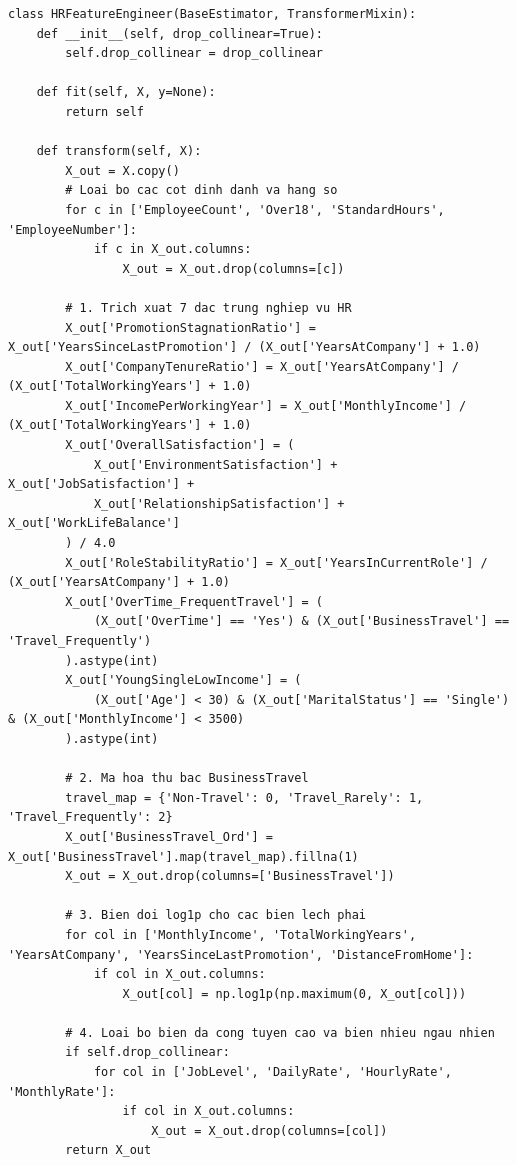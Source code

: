 \documentclass[12pt,a4paper]{article}
\begin{document}
\begin{lstlisting}[caption={Hiện thực hóa bộ biến đổi đặc trưng nghiệp vụ HR (\texttt{src/preprocessing.py}).}, label={lst:fe_class}]
class HRFeatureEngineer(BaseEstimator, TransformerMixin):
    def __init__(self, drop_collinear=True):
        self.drop_collinear = drop_collinear

    def fit(self, X, y=None):
        return self

    def transform(self, X):
        X_out = X.copy()
        # Loai bo cac cot dinh danh va hang so
        for c in ['EmployeeCount', 'Over18', 'StandardHours', 'EmployeeNumber']:
            if c in X_out.columns:
                X_out = X_out.drop(columns=[c])

        # 1. Trich xuat 7 dac trung nghiep vu HR
        X_out['PromotionStagnationRatio'] = X_out['YearsSinceLastPromotion'] / (X_out['YearsAtCompany'] + 1.0)
        X_out['CompanyTenureRatio'] = X_out['YearsAtCompany'] / (X_out['TotalWorkingYears'] + 1.0)
        X_out['IncomePerWorkingYear'] = X_out['MonthlyIncome'] / (X_out['TotalWorkingYears'] + 1.0)
        X_out['OverallSatisfaction'] = (
            X_out['EnvironmentSatisfaction'] + X_out['JobSatisfaction'] +
            X_out['RelationshipSatisfaction'] + X_out['WorkLifeBalance']
        ) / 4.0
        X_out['RoleStabilityRatio'] = X_out['YearsInCurrentRole'] / (X_out['YearsAtCompany'] + 1.0)
        X_out['OverTime_FrequentTravel'] = (
            (X_out['OverTime'] == 'Yes') & (X_out['BusinessTravel'] == 'Travel_Frequently')
        ).astype(int)
        X_out['YoungSingleLowIncome'] = (
            (X_out['Age'] < 30) & (X_out['MaritalStatus'] == 'Single') & (X_out['MonthlyIncome'] < 3500)
        ).astype(int)

        # 2. Ma hoa thu bac BusinessTravel
        travel_map = {'Non-Travel': 0, 'Travel_Rarely': 1, 'Travel_Frequently': 2}
        X_out['BusinessTravel_Ord'] = X_out['BusinessTravel'].map(travel_map).fillna(1)
        X_out = X_out.drop(columns=['BusinessTravel'])

        # 3. Bien doi log1p cho cac bien lech phai
        for col in ['MonthlyIncome', 'TotalWorkingYears', 'YearsAtCompany', 'YearsSinceLastPromotion', 'DistanceFromHome']:
            if col in X_out.columns:
                X_out[col] = np.log1p(np.maximum(0, X_out[col]))

        # 4. Loai bo bien da cong tuyen cao va bien nhieu ngau nhien
        if self.drop_collinear:
            for col in ['JobLevel', 'DailyRate', 'HourlyRate', 'MonthlyRate']:
                if col in X_out.columns:
                    X_out = X_out.drop(columns=[col])
        return X_out
\end{lstlisting}
\end{document}
